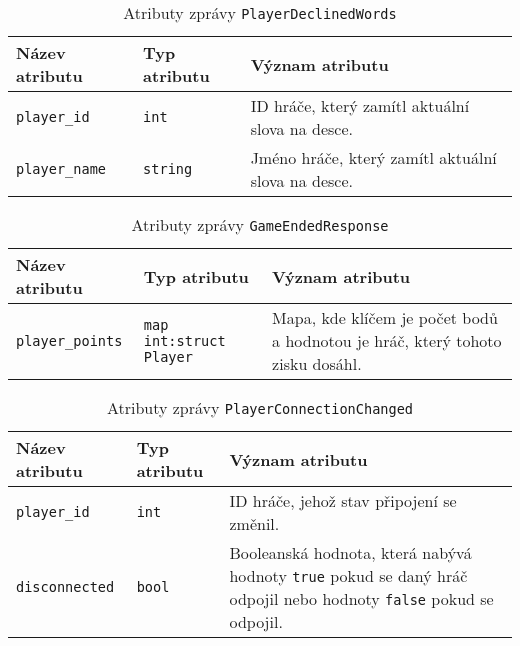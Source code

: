 \documentclass[12pt, a4paper]{article}
\begin{document}
\begin{center}
		\begin{table}[!ht]
		     \caption{Atributy zprávy \texttt{PlayerDeclinedWords}}
		\begin{tabularx}{\textwidth}{|l|l|X|}
			\hline
			\textbf{Název atributu} & \textbf{Typ atributu} & \textbf{Význam atributu} \\ 
			\hline
			\texttt{player\_id}          &\texttt{int}&ID hráče, který zamítl aktuální slova na desce.\\
			\hline
			\texttt{player\_name}          &\texttt{string}&Jméno hráče, který zamítl aktuální slova na desce.\\
			\hline
		\end{tabularx}
		\end{table}
\end{center}  	


\begin{center}
		\begin{table}[!ht]
		     \caption{Atributy zprávy \texttt{GameEndedResponse}}
		\begin{tabularx}{\textwidth}{|l|l|X|}
			\hline
			\textbf{Název atributu} & \textbf{Typ atributu} & \textbf{Význam atributu} \\ 
			\hline
			\texttt{player\_points}          &\texttt{map int:struct Player}&Mapa, kde klíčem je počet bodů a hodnotou je hráč, který tohoto zisku dosáhl.\\
			\hline
		\end{tabularx}
		\end{table}
\end{center}  	

\begin{center}
		\begin{table}[!ht]
		     \caption{Atributy zprávy \texttt{PlayerConnectionChanged}}
		\begin{tabularx}{\textwidth}{|l|l|X|}
			\hline
			\textbf{Název atributu} & \textbf{Typ atributu} & \textbf{Význam atributu} \\ 
			\hline
			\texttt{player\_id}          &\texttt{int}&ID hráče, jehož stav připojení se změnil.\\
			\hline
			\texttt{disconnected}          &\texttt{bool}&Booleanská hodnota, která nabývá hodnoty \texttt{true} pokud se daný hráč odpojil nebo hodnoty \texttt{false} pokud se odpojil.\\
			\hline
		\end{tabularx}
		\end{table}
\end{center}  	
\end{document}
